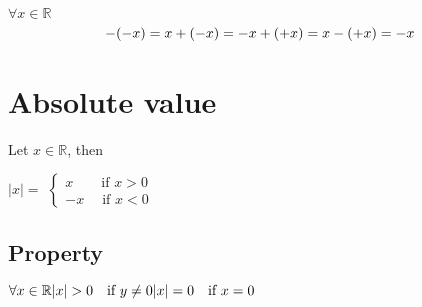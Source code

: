 \documentclass{article}
\begin{document}
$\forall x \in \mathbb{R}$
\[-(-x)=x\\
+(-x)=-x\\
+(+x)=x\\
-(+x)=-x\]

\section{Absolute value}
Let $x \in \mathbb{R}$, then

$|x|=$
$\begin{cases}
    x \qquad \text{if } x > 0\\
    -x \;\quad \text{if } x < 0
\end{cases}$

\subsection{Property}
$\forall x \in \mathbb{R}\\
|x|>0 \quad \text{if } y \neq 0\\
|x|=0 \quad \text{if } x=0$
\end{document}
